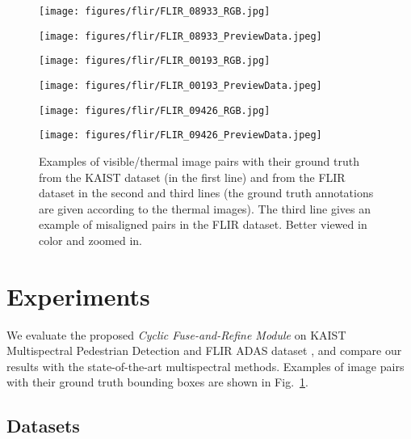 \documentclass{article}
\begin{document}
\begin{figure}[]
\begin{minipage}[b]{.241\linewidth}
\end{minipage}
\begin{minipage}[b]{.241\linewidth}
  \centering
  \centerline{\texttt{[image: figures/flir/FLIR\_08933\_RGB.jpg]}}
\end{minipage}
\begin{minipage}[b]{.241\linewidth}
  \centering
  \centerline{\texttt{[image: figures/flir/FLIR\_08933\_PreviewData.jpeg]}}
\end{minipage}
\begin{minipage}[b]{.241\linewidth}
  \centering
  \centerline{\texttt{[image: figures/flir/FLIR\_00193\_RGB.jpg]}}
\end{minipage}
\begin{minipage}[b]{.241\linewidth}
  \centering
  \centerline{\texttt{[image: figures/flir/FLIR\_00193\_PreviewData.jpeg]}}
\end{minipage}
\begin{minipage}[b]{.241\linewidth}
  \centering
  \centerline{\texttt{[image: figures/flir/FLIR\_09426\_RGB.jpg]}}
\end{minipage}
\begin{minipage}[b]{.241\linewidth}
  \centering
  \centerline{\texttt{[image: figures/flir/FLIR\_09426\_PreviewData.jpeg]}}
\end{minipage}
\caption{Examples of visible/thermal image pairs with their ground truth from the KAIST dataset (in the first line) and from the FLIR dataset in the second and third lines (the ground truth annotations are given according to the thermal images). The third line gives an example of misaligned pairs in the FLIR dataset. 
Better viewed in color and zoomed in.}
\label{fig:example}
\end{figure}

\section{Experiments}
\label{sec:expe}

We evaluate the proposed \textit{Cyclic Fuse-and-Refine Module} on KAIST Multispectral Pedestrian Detection \cite{KAIST} and FLIR ADAS dataset \cite{Flir},
and compare our results with the state-of-the-art multispectral methods. Examples of  image pairs with their ground truth bounding boxes are shown in Fig.~\ref{fig:example}.

\subsection{Datasets}
 
\end{document}
